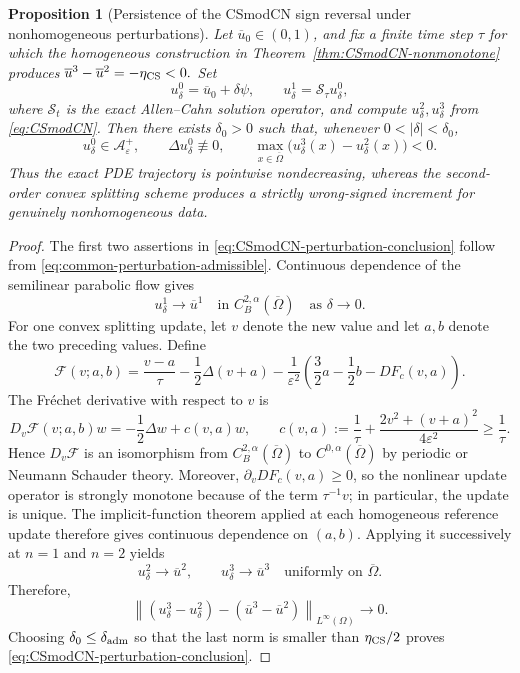 \documentclass[final, 3p, times]{elsarticle}%
\newcommand{\eps}{\varepsilon}
\newcommand{\Aepsp}{\mathcal A_\varepsilon^+}
\newcommand{\Aeps}{\Aepsp}
\newtheorem{proposition}[theorem]{Proposition}
\begin{document}
\begin{proposition}[Persistence of the CSmodCN sign reversal under nonhomogeneous perturbations]
\label{prop:CSmodCN-nonhomogeneous-persistence}
Let $\overline u_0\in(0,1)$, and fix a finite time step $\tau$ for which
the homogeneous construction in Theorem~\ref{thm:CSmodCN-nonmonotone}
produces
$\overline u^{3}-\overline u^{2}=-\eta_{\rm CS}<0.$
Set
\[
    u^0_\delta=\overline u_0+\delta\psi,
    \qquad
    u^1_\delta=\mathcal S_\tau u^0_\delta,
\]
where $\mathcal S_t$ is the exact Allen--Cahn solution operator, and compute
$u^2_\delta,u^3_\delta$ from \eqref{eq:CSmodCN}. Then there exists
$\delta_0>0$ such that, whenever $0<|\delta|<\delta_0$,
\begin{equation}
    u^0_\delta\in\Aeps,
    \qquad
    \Delta u^0_\delta\not\equiv0,
    \qquad
    \max_{x\in\overline\Omega}
    \bigl(u^3_\delta(x)-u^2_\delta(x)\bigr)<0.
\label{eq:CSmodCN-perturbation-conclusion}
\end{equation}
Thus the exact PDE trajectory is pointwise nondecreasing, whereas the
second-order convex splitting scheme produces a strictly wrong-signed
increment for genuinely nonhomogeneous data.
\end{proposition}

\begin{proof}
The first two assertions in \eqref{eq:CSmodCN-perturbation-conclusion}
follow from \eqref{eq:common-perturbation-admissible}. Continuous dependence
of the semilinear parabolic flow gives
\[
    u^1_\delta\longrightarrow\overline u^1
    \quad\text{in }C_B^{2,\alpha}(\overline\Omega)
    \quad\text{as }\delta\to0.
\]
For one convex splitting update, let $v$ denote the new value and let
$a,b$ denote the two preceding values. Define
\[
\mathcal F(v;a,b)
=\frac{v-a}{\tau}-\frac12\Delta(v+a)
-\frac1{\eps^2}
\left(\frac32a-\frac12b-D F_c(v,a)\right).
\]
The Fr\'echet derivative with respect to $v$ is
\begin{equation}
    D_v\mathcal F(v;a,b)w
    =-\frac12\Delta w+c(v,a)w,
    \qquad
    c(v,a):=\frac1\tau
    +\frac{2v^2+(v+a)^2}{4\eps^2}\ge\frac1\tau.
\label{eq:CSmodCN-linearized-operator}
\end{equation}
Hence $D_v\mathcal F$ is an isomorphism from
$C_B^{2,\alpha}(\overline\Omega)$ to
$C^{0,\alpha}(\overline\Omega)$ by periodic or Neumann Schauder theory.
Moreover, $\partial_vD F_c(v,a)\ge0$, so the nonlinear update operator is
strongly monotone because of the term $\tau^{-1}v$; in particular, the
update is unique. The implicit-function theorem applied at each homogeneous
reference update therefore gives continuous dependence on $(a,b)$.
Applying it successively at $n=1$ and $n=2$ yields
\[
    u^2_\delta\longrightarrow\overline u^2,
    \qquad
    u^3_\delta\longrightarrow\overline u^3
    \quad\text{uniformly on }\overline\Omega.
\]
Therefore,
\[
    \left\|(u^3_\delta-u^2_\delta)
    -(\overline u^3-\overline u^2)\right\|_{L^\infty(\Omega)}
    \longrightarrow0.
\]
Choosing $\delta_0\le\delta_{\rm adm}$ so that the last norm is smaller
than $\eta_{\rm CS}/2$ proves
\eqref{eq:CSmodCN-perturbation-conclusion}.
\end{proof}
\end{document}
